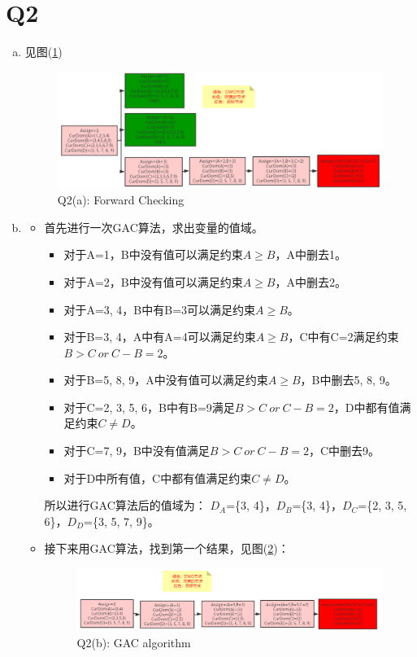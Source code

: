 \documentclass[a4paper, 11pt]{article}
\begin{document}
\section{Q2}
\begin{enumerate}[(a)]
\item
见图(\ref{fig:FC})
\begin{figure}[ht]
  \includegraphics[width=19cm]{2a.PNG}
  \caption{Q2(a): Forward Checking}
  \label{fig:FC}
\end{figure}
\item
\begin{itemize}
  \item 首先进行一次GAC算法，求出变量的值域。
  \begin{itemize}
    \item 对于A=1，B中没有值可以满足约束$A \ge B$，A中删去1。
    \item 对于A=2，B中没有值可以满足约束$A \ge B$，A中删去2。
    \item 对于A=3, 4，B中有B=3可以满足约束$A \ge B$。
    \item 对于B=3, 4，A中有A=4可以满足约束$A \ge B$，C中有C=2满足约束$B>C\ or\ C-B=2$。
    \item 对于B=5, 8, 9，A中没有值可以满足约束$A \ge B$，B中删去5, 8, 9。
    \item 对于C=2, 3, 5, 6，B中有B=9满足$B>C\ or\ C-B=2$，D中都有值满足约束$C \ne D$。
    \item 对于C=7, 9，B中没有值满足$B>C\ or\ C-B=2$，C中删去9。
    \item 对于D中所有值，C中都有值满足约束$C \ne D$。
  \end{itemize}
  所以进行GAC算法后的值域为：
  $D_A$=\{3, 4\}，$D_B$=\{3, 4\}，$D_C$=\{2, 3, 5, 6\}，$D_D$=\{3, 5, 7, 9\}。
  \item 接下来用GAC算法，找到第一个结果，见图(\ref{fig:GAC})：
  \begin{figure}[ht]
    \includegraphics[width=19cm]{2b.PNG}
    \caption{Q2(b): GAC algorithm}
    \label{fig:GAC}
  \end{figure}
\end{itemize}

\end{enumerate}
\end{document}
